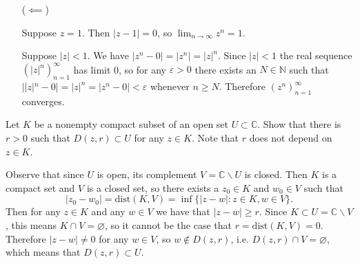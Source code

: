 \documentclass{article}
\newcounter{Problem}
\newenvironment{Problem}{\begin{Exercise}[name={Problem},
                                          counter={Problem}]}
                        {\end{Exercise}}
\begin{document}
\begin{Answer}
\begin{itemize}
{%

      Therefore $|z| < 1$ or $z = 1$.
    }
    \item[($\impliedby$)]{
      Suppose $z = 1$. Then $|z - 1| = 0$, so
      $\lim_{n \to \infty} z^n = 1$.

      Suppose $|z| < 1$. We have
      $|z^n - 0| = |z^n| = |z|^n$. Since $|z| < 1$
      the real sequence $(|z|^n)_{n=1}^\infty$ has limit
      0, so for any $\varepsilon > 0$ there exists an
      $N \in \mathbb{N}$ such that $||z|^n - 0| = |z|^n = |z^n - 0| < \varepsilon$
      whenever $n \geq N$. Therefore $(z^n)_{n=1}^\infty$ converges.
    }
  \end{itemize}
\end{Answer}

\begin{Problem}
  Let $K$ be a nonempty compact subset of an open set
  $U  \subset \mathbb{C}$. Show that there is $r > 0$
  such that $D(z, r) \subset U$ for any $z \in K$.
  Note that $r$ does not depend on $z \in K$.
\end{Problem}

\begin{Answer}
Observe that since $U$ is open, its complement
$V = \mathbb{C} \backslash U$ is closed. Then
$K$ is a compact set and $V$ is a closed set,
so there exists a $z_0 \in K$ and $w_0 \in V$
such that
$$
  |z_0 - w_0|
= \mathrm{dist}(K, V)
= \inf \{ |z - w| : z \in K, w \in V \}.
$$
Then for any $z \in K$ and any $w \in V$
we have that $|z - w| \geq r$. Since
$K \subset U = \mathbb{C} \backslash V$,
this means $K \cap V = \varnothing$, so it cannot
be the case that $r = \mathrm{dist}(K, V) = 0$.
Therefore $|z - w| \neq 0$ for any $w \in V$,
so $w \notin D(z,r)$, i.e.
$D(z, r) \cap V = \varnothing$, which
means that $D(z, r) \subset U$.
\end{Answer}
\end{document}
